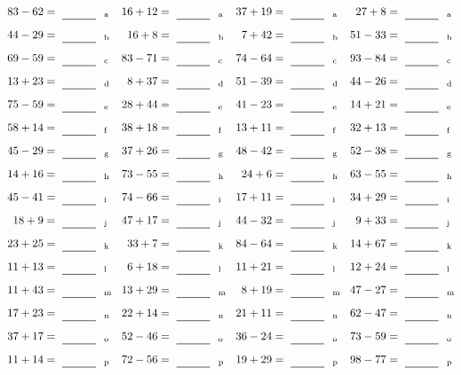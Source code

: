 \documentclass
[
  draft    = true,
  fontsize = 11pt,
  parskip  = half-
]
{scrartcl}
\begin{document}
\clearpage
\begin{align*}
    \pline{83-62}&=\rline{a}
  & \pline{16+12}&=\rline{a}
  & \pline{37+19}&=\rline{a}
  & \pline{27+8}&=\rline{a} \\[1ex]
    \pline{44-29}&=\rline{b}
  & \pline{16+8}&=\rline{b}
  & \pline{7+42}&=\rline{b}
  & \pline{51-33}&=\rline{b} \\[1ex]
    \pline{69-59}&=\rline{c}
  & \pline{83-71}&=\rline{c}
  & \pline{74-64}&=\rline{c}
  & \pline{93-84}&=\rline{c} \\[1ex]
    \pline{13+23}&=\rline{d}
  & \pline{8+37}&=\rline{d}
  & \pline{51-39}&=\rline{d}
  & \pline{44-26}&=\rline{d} \\[1ex]
    \pline{75-59}&=\rline{e}
  & \pline{28+44}&=\rline{e}
  & \pline{41-23}&=\rline{e}
  & \pline{14+21}&=\rline{e} \\[1ex]
    \pline{58+14}&=\rline{f}
  & \pline{38+18}&=\rline{f}
  & \pline{13+11}&=\rline{f}
  & \pline{32+13}&=\rline{f} \\[1ex]
    \pline{45-29}&=\rline{g}
  & \pline{37+26}&=\rline{g}
  & \pline{48-42}&=\rline{g}
  & \pline{52-38}&=\rline{g} \\[1ex]
    \pline{14+16}&=\rline{h}
  & \pline{73-55}&=\rline{h}
  & \pline{24+6}&=\rline{h}
  & \pline{63-55}&=\rline{h} \\[1ex]
    \pline{45-41}&=\rline{i}
  & \pline{74-66}&=\rline{i}
  & \pline{17+11}&=\rline{i}
  & \pline{34+29}&=\rline{i} \\[1ex]
    \pline{18+9}&=\rline{j}
  & \pline{47+17}&=\rline{j}
  & \pline{44-32}&=\rline{j}
  & \pline{9+33}&=\rline{j} \\[1ex]
    \pline{23+25}&=\rline{k}
  & \pline{33+7}&=\rline{k}
  & \pline{84-64}&=\rline{k}
  & \pline{14+67}&=\rline{k} \\[1ex]
    \pline{11+13}&=\rline{l}
  & \pline{6+18}&=\rline{l}
  & \pline{11+21}&=\rline{l}
  & \pline{12+24}&=\rline{l} \\[1ex]
    \pline{11+43}&=\rline{m}
  & \pline{13+29}&=\rline{m}
  & \pline{8+19}&=\rline{m}
  & \pline{47-27}&=\rline{m} \\[1ex]
    \pline{17+23}&=\rline{n}
  & \pline{22+14}&=\rline{n}
  & \pline{21+11}&=\rline{n}
  & \pline{62-47}&=\rline{n} \\[1ex]
    \pline{37+17}&=\rline{o}
  & \pline{52-46}&=\rline{o}
  & \pline{36-24}&=\rline{o}
  & \pline{73-59}&=\rline{o} \\[1ex]
    \pline{11+14}&=\rline{p}
  & \pline{72-56}&=\rline{p}
  & \pline{19+29}&=\rline{p}
  & \pline{98-77}&=\rline{p}
\end{align*}
\end{document}
